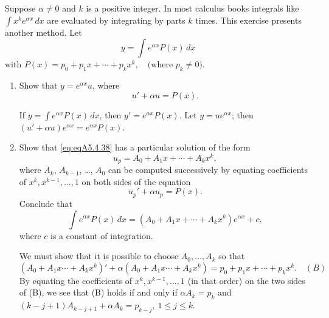 \documentclass{ximera}
\begin{document}
\begin{problem}\label{exer:5.4.38}
Suppose $\alpha\ne0$ and $k$ is a positive integer. In most calculus books integrals like $\int x^k e^{\alpha x}\,dx$ are
evaluated by integrating by parts $k$ times. This exercise presents
another method. Let
$$
y=\int e^{\alpha x}P(x)\,dx
$$
with
$P(x)=p_0+p_1x+\cdots+p_kx^k, \quad \text{(where } p_k\ne0).$

\begin{enumerate}
\item %
Show that $y=e^{\alpha x}u$, where \begin{equation}\label{eq:eqA5.4.38}
u'+\alpha u=P(x).
\end{equation}
\begin{solution}
If $y=\int e^{\alpha x}P(x)\,dx$, then
$y'=e^{\alpha x}P(x)$. Let $y=ue^{\alpha x}$; then $(u'+\alpha
u)e^{\alpha x}=e^{\alpha x}P(x)$.
\end{solution}

\item %
Show that \ref{eq:eqA5.4.38} has a particular solution of the form
$$
u_p=A_0+A_1x+\cdots+A_kx^k,
$$
where $A_k$, $A_{k-1}$, \dots, $A_0$ can be computed successively
by equating coefficients of $x^k,x^{k-1}, \dots,1$ on both sides of the
equation
$$
u_p'+\alpha u_p=P(x).
$$
Conclude that
$$
\int e^{\alpha x}P(x)\,dx=\left(A_0+A_1x+\cdots+A_kx^k\right)e^{\alpha x}
+c,
$$
where $c$ is a constant of integration.
\begin{solution}
We must show that
it is possible to choose $A_0,\dots,A_k$ so that
$$(A_0+A_1x\cdots+A_kx^k)'+\alpha(A_0+A_1x\cdots+A_kx^k)=
p_0+p_1x+\cdots+p_kx^k.  \quad (B)$$ By equating the coefficients of $x^k,
x^{k-1},\dots,1$ (in that order) on the two sides of (B), we see that
(B) holds if and only if $\alpha A_k=p_k$ and $(k-j+1)A_{k-j+1}+\alpha
A_k=p_{k-j},\ 1\le j\le k$.
\end{solution}
\end{enumerate}
\end{problem}
\end{document}
